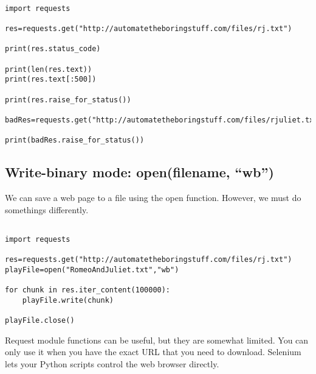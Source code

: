 \documentclass[11pt]{article}
\begin{document}
\begin{verbatim}

import requests

res=requests.get("http://automatetheboringstuff.com/files/rj.txt")

print(res.status_code)

print(len(res.text))
print(res.text[:500])

print(res.raise_for_status())

badRes=requests.get("http://automatetheboringstuff.com/files/rjuliet.txt")

print(badRes.raise_for_status())

\end{verbatim}

\subsection{Write-binary mode: open(filename, ``wb'')}
\label{sec:org8dfd6ab}

We can save a web page to a file using the open function. However, we must do somethings differently.

\begin{verbatim}

import requests

res=requests.get("http://automatetheboringstuff.com/files/rj.txt")
playFile=open("RomeoAndJuliet.txt","wb")

for chunk in res.iter_content(100000):
    playFile.write(chunk)

playFile.close()

\end{verbatim}

Request module functions can be useful, but they are somewhat limited. You can only use it when you have the exact URL that you need to download. Selenium lets your Python scripts control the web browser directly.
\end{document}

